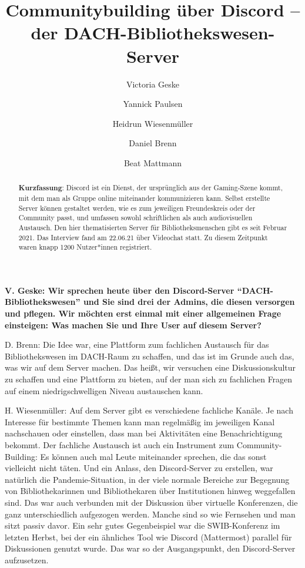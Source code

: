 \documentclass[a4paper,
fontsize=11pt,
oneside,
numbers=noperiodatend,
parskip=half-,
bibliography=totoc,
final
]{scrartcl}
\title{\LARGE{Communitybuilding über Discord – der DACH-Bibliothekswesen-Server}}%
\author{Victoria Geske \and Yannick Paulsen \and Heidrun Wiesenmüller \and Daniel Brenn \and Beat Mattmann} %
\date{}
\begin{document}
\maketitle
\thispagestyle{fancyplain} 

\begin{abstract}
\noindent
\textbf{Kurzfassung}: Discord ist ein Dienst, der ursprünglich aus der
Gaming-Szene kommt, mit dem man als Gruppe online miteinander
kommunizieren kann. Selbst erstellte Server können gestaltet werden, wie
es zum jeweiligen Freundeskreis oder der Community passt, und umfassen
sowohl schriftlichen als auch audiovisuellen Austausch. Den hier
thematisierten Server für Bibliotheksmenschen gibt es seit Februar 2021.
Das Interview fand am 22.06.21 über Videochat statt. Zu diesem Zeitpunkt
waren knapp 1200 Nutzer*innen registriert.
\end{abstract}

\textbf{V. Geske: Wir sprechen heute über den Discord-Server
\enquote{DACH-Bibliothekswesen} und Sie sind drei der Admins, die diesen
versorgen und pflegen. Wir möchten erst einmal mit einer allgemeinen
Frage einsteigen: Was machen Sie und Ihre User auf diesem Server?}

D. Brenn: Die Idee war, eine Plattform zum fachlichen Austausch für das
Bibliothekswesen im DACH-Raum zu schaffen, und das ist im Grunde auch
das, was wir auf dem Server machen. Das heißt, wir versuchen eine
Diskussionskultur zu schaffen und eine Plattform zu bieten, auf der man
sich zu fachlichen Fragen auf einem niedrigschwelligen Niveau
austauschen kann.

H. Wiesenmüller: Auf dem Server gibt es verschiedene fachliche Kanäle.
Je nach Interesse für bestimmte Themen kann man regelmäßig im jeweiligen
Kanal nachschauen oder einstellen, dass man bei Aktivitäten eine
Benachrichtigung bekommt. Der fachliche Austausch ist auch ein
Instrument zum Community-Building: Es können auch mal Leute miteinander
sprechen, die das sonst vielleicht nicht täten. Und ein Anlass, den
Discord-Server zu erstellen, war natürlich die Pandemie-Situation, in
der viele normale Bereiche zur Begegnung von Bibliothekarinnen und
Bibliothekaren über Institutionen hinweg weggefallen sind. Das war auch
verbunden mit der Diskussion über virtuelle Konferenzen, die ganz
unterschiedlich aufgezogen werden. Manche sind so wie Fernsehen und man
sitzt passiv davor. Ein sehr gutes Gegenbeispiel war die SWIB-Konferenz
im letzten Herbst, bei der ein ähnliches Tool wie Discord (Mattermost)
parallel für Diskussionen genutzt wurde. Das war so der Ausgangspunkt,
den Discord-Server aufzusetzen.
\end{document}
